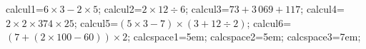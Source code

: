 \documentclass[exercice]{thedocument}%
\begin{document}
%
\>calcul1=$6\times3-2\times5$;%
\>calcul2=$2\times12\div6$;%
\>calcul3=$73+3\,069+117$;%
\>calcul4=$2\times2\times374\times25$;%
\>calcul5=$(5\times3-7)\times(3+12\div2)$;%
\>calcul6=$(7+(2\times100-60))\times2$;%
\>calcspace1=5em;%
\>calcspace2=5em;%
\>calcspace3=7em;%
%
\end{document}
